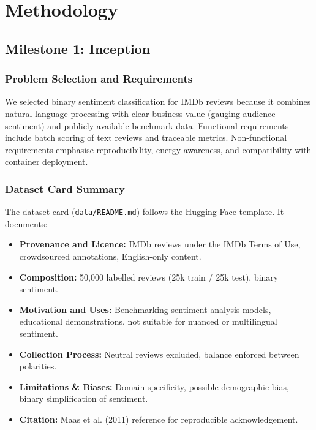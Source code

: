 \documentclass[11pt,a4paper]{article}
\begin{document}
\section{Methodology}
\subsection{Milestone 1: Inception}
\subsubsection{Problem Selection and Requirements}
We selected binary sentiment classification for IMDb reviews because it combines natural language processing with clear business value (gauging audience sentiment) and publicly available benchmark data. Functional requirements include batch scoring of text reviews and traceable metrics. Non-functional requirements emphasise reproducibility, energy-awareness, and compatibility with container deployment.

\subsubsection{Dataset Card Summary}
The dataset card (\texttt{data/README.md}) follows the Hugging Face template. It documents:\begin{itemize}[leftmargin=*]
  \item \textbf{Provenance and Licence:} IMDb reviews under the IMDb Terms of Use, crowdsourced annotations, English-only content.
  \item \textbf{Composition:} 50,000 labelled reviews (25k train / 25k test), binary sentiment.
  \item \textbf{Motivation and Uses:} Benchmarking sentiment analysis models, educational demonstrations, not suitable for nuanced or multilingual sentiment.
  \item \textbf{Collection Process:} Neutral reviews excluded, balance enforced between polarities.
  \item \textbf{Limitations \& Biases:} Domain specificity, possible demographic bias, binary simplification of sentiment.
  \item \textbf{Citation:} Maas et al. (2011) reference for reproducible acknowledgement.
\end{itemize}
\end{document}
